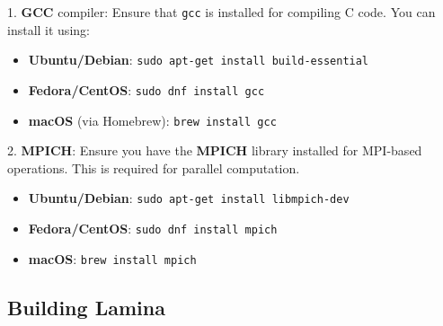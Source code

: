 \documentclass[a4paper,10pt]{article}
\begin{document}
1. \textbf{GCC} compiler: Ensure that \texttt{gcc} is installed for compiling C code. You can install it using:

   \begin{itemize}
      \item \textbf{Ubuntu/Debian}: \texttt{sudo apt-get install build-essential}
      \item \textbf{Fedora/CentOS}: \texttt{sudo dnf install gcc}
      \item \textbf{macOS} (via Homebrew): \texttt{brew install gcc}
   \end{itemize}

2. \textbf{MPICH}: Ensure you have the \textbf{MPICH} library installed for MPI-based operations. This is required for 
parallel computation.

   \begin{itemize}
      \item \textbf{Ubuntu/Debian}: \texttt{sudo apt-get install libmpich-dev}
      \item \textbf{Fedora/CentOS}: \texttt{sudo dnf install mpich}
      \item \textbf{macOS}: \texttt{brew install mpich}
   \end{itemize}

\subsection*{Building Lamina}
\end{document}
